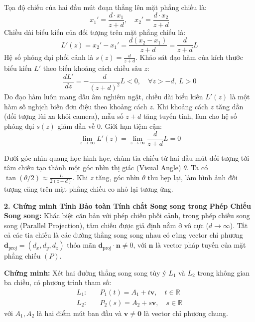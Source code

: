 Tọa độ chiếu của hai đầu mút đoạn thẳng lên mặt phẳng chiếu là:
\begin{equation}
x_1' = \frac{d \cdot x_1}{z + d}, \quad x_2' = \frac{d \cdot x_2}{z + d}
\end{equation}
Chiều dài biểu kiến của đối tượng trên mặt phẳng chiếu là:
\begin{equation}
\label{eq:projected_length_formula}
L'(z) = x_2' - x_1' = \frac{d(x_2 - x_1)}{z + d} = \frac{d}{z + d} L
\end{equation}
Hệ số phóng đại phối cảnh là $s(z) = \frac{d}{z + d}$. Khảo sát đạo hàm của kích thước biểu kiến $L'$ theo biến khoảng cách chiều sâu $z$:
\begin{equation}
\frac{d L'}{dz} = -\frac{d}{(z + d)^2} L < 0, \quad \forall z > -d, \ L > 0
\end{equation}
Do đạo hàm luôn mang dấu âm nghiêm ngặt, chiều dài biểu kiến $L'(z)$ là một hàm số nghịch biến đơn điệu theo khoảng cách $z$. Khi khoảng cách $z$ tăng dần (đối tượng lùi xa khỏi camera), mẫu số $z + d$ tăng tuyến tính, làm cho hệ số phóng đại $s(z)$ giảm dần về $0$. Giới hạn tiệm cận:
\begin{equation}
\lim_{z \to \infty} L'(z) = \lim_{z \to \infty} \frac{d}{z + d} L = 0
\end{equation}

Dưới góc nhìn quang học hình học, chùm tia chiếu từ hai đầu mút đối tượng tới tâm chiếu tạo thành một góc nhìn thị giác (Visual Angle) $\theta$. Ta có $\tan(\theta/2) \approx \frac{L}{2(z + d)}$. Khi $z$ tăng, góc nhìn $\theta$ thu hẹp lại, làm hình ảnh đối tượng căng trên mặt phẳng chiếu co nhỏ lại tương ứng.

\textbf{2. Chứng minh Tính Bảo toàn Tính chất Song song trong Phép Chiếu Song song:}
Khác biệt căn bản với phép chiếu phối cảnh, trong phép chiếu song song (Parallel Projection), tâm chiếu được giả định nằm ở vô cực ($d \to \infty$). Tất cả các tia chiếu là các đường thẳng song song nhau có cùng vector chỉ phương $\mathbf{d}_{\text{proj}} = (d_x, d_y, d_z)$ thỏa mãn $\mathbf{d}_{\text{proj}} \cdot \mathbf{n} \neq 0$, với $\mathbf{n}$ là vector pháp tuyến của mặt phẳng chiếu $(P)$.

\textbf{Chứng minh:}
Xét hai đường thẳng song song tùy ý $L_1$ và $L_2$ trong không gian ba chiều, có phương trình tham số:
\begin{align}
L_1: & \quad P_1(t) = A_1 + t \mathbf{v}, \quad t \in \mathbb{R} \\
L_2: & \quad P_2(s) = A_2 + s \mathbf{v}, \quad s \in \mathbb{R}
\end{align}
với $A_1, A_2$ là hai điểm mút ban đầu và $\mathbf{v} \neq \mathbf{0}$ là vector chỉ phương chung.

